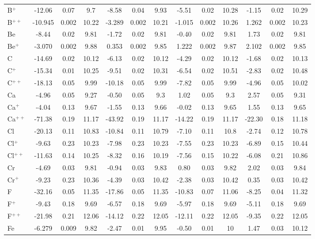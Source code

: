 \begin{longtable}{l!{\vrule width 0.25pt}ccc!{\vrule width 0.25pt}ccc!{\vrule width 0.25pt}ccc!{\vrule width 0.25pt}ccc}
B$^+$ & -12.06 & 0.07 & 9.7 & -8.58 & 0.04 & 9.93 & -5.51 & 0.02 & 10.28 & -1.15 & 0.02 & 10.29 \\
B$^{++}$ & -10.945 & 0.002 & 10.22 & -3.289 & 0.002 & 10.21 & -1.015 & 0.002 & 10.26 & 1.262 & 0.002 & 10.23 \\
Be & -8.44 & 0.02 & 9.81 & -1.72 & 0.02 & 9.81 & -0.40 & 0.02 & 9.81 & 1.73 & 0.02 & 9.81 \\
Be$^+$ & -3.070 & 0.002 & 9.88 & 0.353 & 0.002 & 9.85 & 1.222 & 0.002 & 9.87 & 2.102 & 0.002 & 9.85 \\
C & -14.69 & 0.02 & 10.12 & -6.13 & 0.02 & 10.12 & -4.29 & 0.02 & 10.12 & -1.68 & 0.02 & 10.13 \\
C$^+$ & -15.34 & 0.01 & 10.25 & -9.51 & 0.02 & 10.31 & -6.54 & 0.02 & 10.51 & -2.83 & 0.02 & 10.48 \\
C$^{++}$ & -18.13 & 0.05 & 9.99 & -10.18 & 0.05 & 9.99 & -7.82 & 0.05 & 9.99 & -4.96 & 0.05 & 10.02 \\
Ca & -4.96 & 0.05 & 9.27 & -0.50 & 0.05 & 9.3 & 1.02 & 0.05 & 9.3 & 2.57 & 0.05 & 9.31 \\
Ca$^+$ & -4.04 & 0.13 & 9.67 & -1.55 & 0.13 & 9.66 & -0.02 & 0.13 & 9.65 & 1.55 & 0.13 & 9.65 \\
Ca$^{++}$ & -71.38 & 0.19 & 11.17 & -43.92 & 0.19 & 11.17 & -14.22 & 0.19 & 11.17 & -22.30 & 0.18 & 11.18 \\
Cl & -20.13 & 0.11 & 10.83 & -10.84 & 0.11 & 10.79 & -7.10 & 0.11 & 10.8 & -2.74 & 0.12 & 10.78 \\
Cl$^+$ & -9.63 & 0.23 & 10.23 & -7.98 & 0.23 & 10.23 & -7.55 & 0.23 & 10.23 & -6.89 & 0.15 & 10.44 \\
Cl$^{++}$ & -11.63 & 0.14 & 10.25 & -8.32 & 0.16 & 10.19 & -7.56 & 0.15 & 10.22 & -6.08 & 0.21 & 10.86 \\
Cr & -4.69 & 0.03 & 9.81 & -0.94 & 0.03 & 9.83 & 0.80 & 0.03 & 9.82 & 2.02 & 0.03 & 9.84 \\
Cr$^+$ & -9.23 & 0.23 & 10.36 & -4.39 & 0.03 & 10.42 & -2.38 & 0.03 & 10.42 & 0.35 & 0.03 & 10.42 \\
F & -32.16 & 0.05 & 11.35 & -17.86 & 0.05 & 11.35 & -10.83 & 0.07 & 11.06 & -8.25 & 0.04 & 11.32 \\
F$^+$ & -9.43 & 0.18 & 9.69 & -6.57 & 0.18 & 9.69 & -5.97 & 0.18 & 9.69 & -5.11 & 0.18 & 9.69 \\
F$^{++}$ & -21.98 & 0.21 & 12.06 & -14.12 & 0.22 & 12.05 & -12.11 & 0.22 & 12.05 & -9.35 & 0.22 & 12.05 \\
Fe & -6.279 & 0.009 & 9.82 & -2.47 & 0.01 & 9.95 & -0.50 & 0.01 & 10 & 1.47 & 0.03 & 10.12 \\

\end{longtable}
